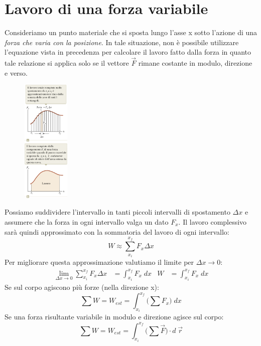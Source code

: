 \documentclass[a4paper,11pt,oneside]{book}
\begin{document}
\section{Lavoro di una forza variabile}
Consideriamo un punto materiale che si sposta lungo l’asse x sotto l’azione di una \emph{forza che varia con la posizione}. In tale situazione, non è possibile utilizzare l'equazione vista in
precedenza per calcolare il lavoro fatto dalla forza in quanto tale relazione si applica solo se il vettore $\vec{F}$ rimane costante in modulo, direzione e verso.

\begin{figure}
    \centering
    \includegraphics[width=0.20\textwidth]{lavoro_forza_variabile.png}
\end{figure}
Possiamo suddividere l'intervallo in tanti piccoli intervalli di spostamento $\Delta x$ e assumere che la forza in ogni intervallo valga un dato $F_x$. 
Il lavoro complessivo sarà quindi approssimato con la sommatoria
del lavoro di ogni intervallo:
\begin{equation*}
    W \approx \sum_{x_i}^{x_f} F_x \Delta x
\end{equation*}
Per migliorare questa approssimazione valutiamo il limite per $\Delta x \to 0$:
\begin{align*}
    \lim_{\Delta x \to 0} \sum_{x_i}^{x_f} F_x \Delta x &= \int_{x_i}^{x_f} F_x \; dx & W&= \int_{x_i}^{x_f} F_x \; dx
\end{align*}
Se sul corpo agiscono più forze (nella direzione x):
\begin{equation*}
    \sum W = W_{est} = \int_{x_i}^{x_f} \big(\sum F_x \big) \; dx
\end{equation*}
Se una forza risultante variabile in modulo e direzione agisce sul corpo:
\begin{equation*}
    \sum W = W_{est} = \int_{x_i}^{x_f} \big(\sum \vec{F} \big) \cdot d \; \vec{r}
\end{equation*}
\end{document}

